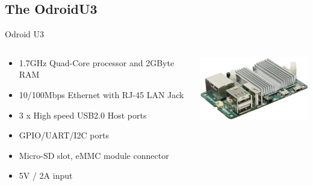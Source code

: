\documentclass{beamer}
\begin{document}
\subsection{The OdroidU3}
\begin{frame}{Odroid U3}
  \begin{columns}[C] %
    \begin{column}{5cm} %
      \begin{itemize}
      \item 1.7GHz Quad-Core processor and 2GByte RAM
      \item 10/100Mbps Ethernet with RJ-45 LAN Jack
      \item 3 x High speed USB2.0 Host ports
      \item GPIO/UART/I2C ports
      \item Micro-SD slot, eMMC module connector
      \item 5V / 2A input
      \end{itemize}
    \end{column}
    \begin{column}{5cm} %
      \includegraphics[width=5cm]{images/201312222305368236.eps}
    \end{column}
  \end{columns}
\end{frame}
\end{document}
